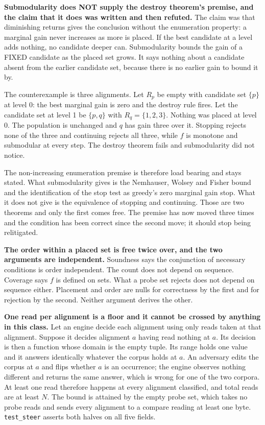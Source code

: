 \textbf{Submodularity does NOT supply the destroy theorem's premise, and the claim that it does was written and then refuted.} The claim was that diminishing returns gives the conclusion without the enumeration property: a marginal gain never increases as more is placed. If the best candidate at a level adds nothing, no candidate deeper can. Submodularity bounds the gain of a FIXED candidate as the placed set grows. It says nothing about a candidate absent from the earlier candidate set, because there is no earlier gain to bound it by.

The counterexample is three alignments. Let \(R_p\) be empty with candidate set \(\{p\}\) at level 0: the best marginal gain is zero and the destroy rule fires. Let the candidate set at level 1 be \(\{p, q\}\) with \(R_q = \{1,2,3\}\). Nothing was placed at level 0. The population is unchanged and \(q\) has gain three over it. Stopping rejects none of the three and continuing rejects all three, while \(f\) is monotone and submodular at every step. The destroy theorem fails and submodularity did not notice.

The non-increasing enumeration premise is therefore load bearing and stays stated. What submodularity gives is the Nemhauser, Wolsey and Fisher bound and the identification of the stop test as greedy's zero marginal gain stop. What it does not give is the equivalence of stopping and continuing. Those are two theorems and only the first comes free. The premise has now moved three times and the condition has been correct since the second move; it should stop being relitigated.

\textbf{The order within a placed set is free twice over, and the two arguments are independent.} Soundness says the conjunction of necessary conditions is order independent. The count does not depend on sequence. Coverage says \(f\) is defined on sets. What a probe set rejects does not depend on sequence either. Placement and order are nulls for correctness by the first and for rejection by the second. Neither argument derives the other.

\textbf{One read per alignment is a floor and it cannot be crossed by anything in this class.} Let an engine decide each alignment using only reads taken at that alignment. Suppose it decides alignment \(a\) having read nothing at \(a\). Its decision is then a function whose domain is the empty tuple. Its range holds one value and it answers identically whatever the corpus holds at \(a\). An adversary edits the corpus at \(a\) and flips whether \(a\) is an occurrence; the engine observes nothing different and returns the same answer, which is wrong for one of the two corpora. At least one read therefore happens at every alignment classified, and total reads are at least \(N\). The bound is attained by the empty probe set, which takes no probe reads and sends every alignment to a compare reading at least one byte. \texttt{test\_steer} asserts both halves on all five fields.

